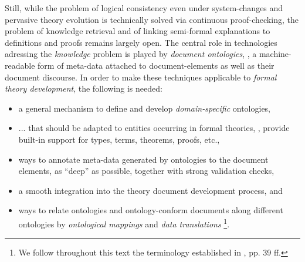 \begin{isabellebody}
\begin{isamarkuptext*}
Still, while the problem of logical consistency
even under system-changes and pervasive theory evolution is technically solved via continuous 
proof-checking, the problem of knowledge retrieval and of linking semi-formal explanations to 
definitions and proofs remains largely open.
The central role in technologies adressing the \emph{knowledge} problem
is played by \emph{document ontologies}, \ie, a machine-readable form
of meta-data attached to document-elements as well as their document discourse. In order 
to make these techniques applicable to \emph{formal theory development},
the following is needed: \vspace{0.2cm}

%
\begin{itemize}%
\item a general mechanism to define and develop \emph{domain-specific} ontologies,

\item ... that should be adapted to entities occurring in formal theories,
\ie, provide built-in support for types, terms, theorems, proofs, etc.,

\item ways to annotate meta-data generated by ontologies to the document elements,
as ``deep'' as possible, together with strong validation checks,

\item a smooth integration into the theory document development process, and

\item ways to relate ontologies and ontology-conform documents along different
ontologies by \emph{ontological mappings} and \emph{data translations}
\footnote{We follow throughout this text the terminology established in 
              \cite{books/daglib/0032976}, pp. 39 ff.}.%
\end{itemize}
\end{isamarkuptext*}\isamarkuptrue%


\end{isabellebody}
